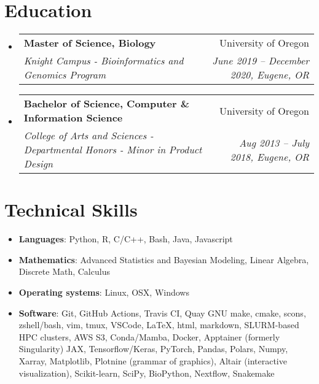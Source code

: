 \documentclass[letterpaper,9pt]{article}
\makeatletter
\newcommand{\resumeNoWrapItem}[2]{
  \item\small{
    \textbf{#1}{: #2 \vspace{-2pt}}
  }
}
\newcommand{\resumeSubheading}[4]{
  \vspace{-1pt}\item
    \begin{tabular*}{0.97\textwidth}[t]{l@{\extracolsep{\fill}}r}
      \textbf{#1} & #2 \\
      \textit{\small#3} & \textit{\small #4} \\
    \end{tabular*}\vspace{-3pt}
}
\newcommand{\resumeSubItem}[2]{\resumeNoWrapItem{#1}{#2}\vspace{-2pt}}
\newcommand{\resumeSubHeadingListStart}{\begin{itemize}[leftmargin=*]}
\newcommand{\resumeSubHeadingListEnd}{\end{itemize}}
\makeatother
\begin{document}
{%

}

\section{Education}
    \resumeSubHeadingListStart
        \resumeSubheading
            {Master of Science, Biology}{University of Oregon}
            {Knight Campus - Bioinformatics and Genomics Program}{June 2019 -- December 2020, Eugene, OR}
        \resumeSubheading
            {Bachelor of Science, Computer \& Information Science}{University of Oregon}
            {College of Arts and Sciences - Departmental Honors - Minor in Product Design}{Aug 2013 -- July 2018, Eugene, OR}
    \resumeSubHeadingListEnd

\section{Technical Skills}

\resumeSubHeadingListStart
    \resumeSubItem{Languages}
        {
            Python, R, C/C++, Bash, Java, Javascript
        }
    \resumeSubItem{Mathematics}
        {
            Advanced Statistics and Bayesian Modeling, 
            Linear Algebra, 
            Discrete Math, 
            Calculus
        }
    \resumeSubItem{Operating systems}
        {
            Linux, OSX, Windows
        }
    \resumeSubItem{Software}
        {
            Git, GitHub Actions, Travis CI, Quay %
            GNU make, cmake, scons, %
            zshell/bash, vim, tmux, %
            VSCode,
            \LaTeX, html, markdown,
            SLURM-based HPC clusters, 
            AWS S3, %
            Conda/Mamba, %
            Docker, Apptainer (formerly Singularity) %
            JAX, Tensorflow/Keras, PyTorch, 
            Pandas, Polars, Numpy, Xarray, 
            Matplotlib, Plotnine (grammar of graphics), Altair (interactive visualization),
            Scikit-learn, SciPy, BioPython,
            Nextflow, Snakemake
        }
\resumeSubHeadingListEnd
\end{document}
